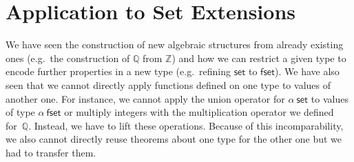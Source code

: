 \documentclass{article}
\newcommand{\kevin}[1]{\textcolor{violet}{\textbf{Kevin}: #1}}
\newcommand{\juli}[1]{\textcolor{orange}{\textbf{Juli}: #1}}
\theoremstyle{definition}
\newtheorem{definition}{Definition}[section]
\newcommand{\inte}{\mathbb{Z}}
\newcommand{\rat}{\mathbb{Q}}
\newcommand{\liftrel}{lifting relation\xspace}
\newcommand{\liftrels}{lifting relations\xspace}
\begin{document}


\section{Application to Set Extensions}\label{sec:appl}
We have seen the construction of new algebraic structures from already existing ones
(e.g.\ the construction of \(\rat\) from \(\inte\)) and how we can restrict a given type to encode further properties in a new type
(e.g.\ refining \(\mathsf{set}\) to \(\mathsf{fset}\)).
We have also seen that we cannot directly apply functions defined on one
type to values of another one.
For instance, we cannot apply the union operator for \(\alpha\ \mathsf{set}\) to values of type \(\alpha\ \mathsf{fset}\) or multiply integers with the multiplication operator we defined for~\(\rat\).
Instead, we have to lift these operations.
Because of this incomparability,
we also cannot directly reuse theorems about one type for the other one
but we had to transfer them.
\end{document}
